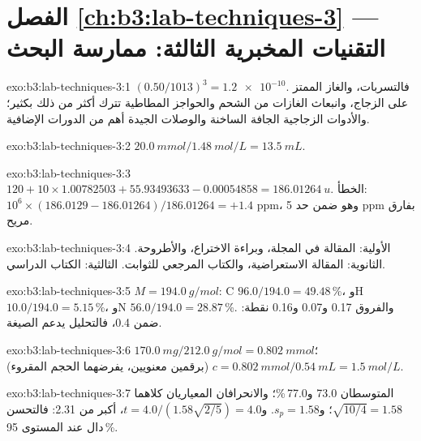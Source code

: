 \section*{الفصل \ref{ch:b3:lab-techniques-3} --- التقنيات المخبرية الثالثة: ممارسة البحث}

\begin{solution}{exo:b3:lab-techniques-3:1}
$(0.50/1013)^3 = \num{1.2e-10}$. فالتسربات، والغاز الممتز على الزجاج، وانبعاث الغازات من الشحم والحواجز المطاطية
تترك أكثر من ذلك بكثير؛ والأدوات الزجاجية الجافة الساخنة والوصلات الجيدة أهم من
الدورات الإضافية.
\end{solution}

\begin{solution}{exo:b3:lab-techniques-3:2}
$\qty{20.0}{mmol}/\qty{1.48}{mol/L} = \qty{13.5}{mL}$.
\end{solution}

\begin{solution}{exo:b3:lab-techniques-3:3}
$120 + 10 \times 1.00782503 + 55.93493633 - 0.00054858 = \qty{186.01264}{u}$. الخطأ: $10^6 \times (186.0129 - 186.01264)/186.01264 = +1.4$ ppm،
وهو ضمن حد 5 ppm بفارق مريح.
\end{solution}

\begin{solution}{exo:b3:lab-techniques-3:4}
الأولية: المقالة في المجلة، وبراءة الاختراع، والأطروحة. الثانوية: المقالة الاستعراضية، 
والكتاب المرجعي للثوابت. الثالثية: الكتاب الدراسي.
\end{solution}

\begin{solution}{exo:b3:lab-techniques-3:5}
$M = \qty{194.0}{g/mol}$: C $96.0/194.0 = 49.48$\,\%، وH $10.0/194.0 = 5.15$\,\%، وN $56.0/194.0 = 28.87$\,\%. والفروق 0.17 و0.07 و0.16
نقطة: ضمن 0.4، فالتحليل يدعم الصيغة.
\end{solution}

\begin{solution}{exo:b3:lab-techniques-3:6}
$\qty{170.0}{mg}/\qty{212.0}{g/mol} = \qty{0.802}{mmol}$؛ $c = \qty{0.802}{mmol}/\qty{0.54}{mL} = \qty{1.5}{mol/L}$ (برقمين معنويين، يفرضهما
الحجم المقروء).
\end{solution}

\begin{solution}{exo:b3:lab-techniques-3:7}
المتوسطان 73.0 و77.0\,\%؛ والانحرافان المعياريان كلاهما $\sqrt{10/4} = 1.58$؛ و$s_p = 1.58$. و$t = 4.0/(1.58\sqrt{2/5}) = 4.0$، أكبر من
2.31: فالتحسن دال عند المستوى 95\,\%.
\end{solution}

